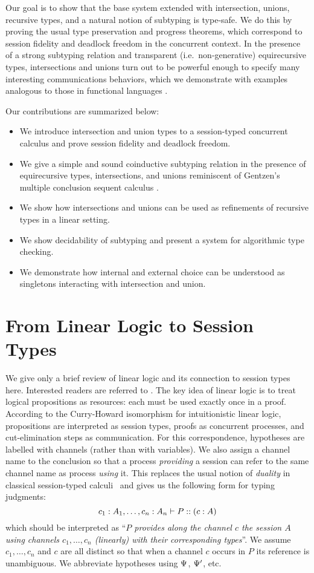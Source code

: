 \documentclass[submission,copyright,creativecommons]{eptcs}
\begin{document}
Our goal is to show that the base system extended with intersection, unions, recursive types, and a natural notion of subtyping is type-safe. We do this by proving the usual type preservation and progress theorems, which correspond to session fidelity and deadlock freedom in the concurrent context. In the presence of a strong subtyping relation and transparent (i.e.\ non-generative)  equirecursive types, intersections and unions turn out to be powerful enough to specify many interesting communications behaviors, which we demonstrate with examples analogous to those in functional languages \cite{FreemanP91,Dunfield03}.

Our contributions are summarized below:
\begin{itemize}
  \item We introduce intersection and union types to a session-typed concurrent calculus and prove session fidelity and deadlock freedom.
  \item We give a simple and sound coinductive subtyping relation in the presence of equirecursive types, intersections, and unions reminiscent of Gentzen's multiple conclusion sequent calculus \cite{Gentzen35, Girard87}.
  \item We show how intersections and unions can be used as refinements of recursive types in a linear setting.
  \item We show decidability of subtyping and present a system for algorithmic type checking.
  \item We demonstrate how internal and external choice can be understood as singletons interacting with intersection and union.
\end{itemize}


\section{From Linear Logic to Session Types}
\label{base}
We give only a brief review of linear logic and its connection to session types here. Interested readers are referred to \cite{CairesP10, PfenningG15, Honda93}. The key idea of linear logic is to treat logical propositions as resources: each must be used exactly once in a proof. According to the Curry-Howard isomorphism for intuitionistic linear logic, propositions are interpreted as session types, proofs as concurrent processes, and cut-elimination steps as communication. For this correspondence, hypotheses are labelled with channels (rather than with variables). We also assign a channel name to the conclusion so that a process \emph{providing} a session can refer to the same channel name as process \emph{using} it. This replaces the usual notion of \emph{duality} in classical session-typed calculi~\cite{Honda93} and gives us the following form for typing judgments:
$$ c_1 : A_1, \ldots, c_n : A_n \vdash P :: (c : A)$$
which should be interpreted as ``\emph{$P$ provides along the channel $c$ the session $A$ using channels $c_1, \ldots, c_n$ (linearly) with their corresponding types}''. We assume $c_1, \ldots, c_n$ and $c$ are all distinct so that when a channel $c$ occurs in $P$ its reference is unambiguous.  We abbreviate hypotheses using $\Psi$,
$\Psi'$, etc.
\end{document}
